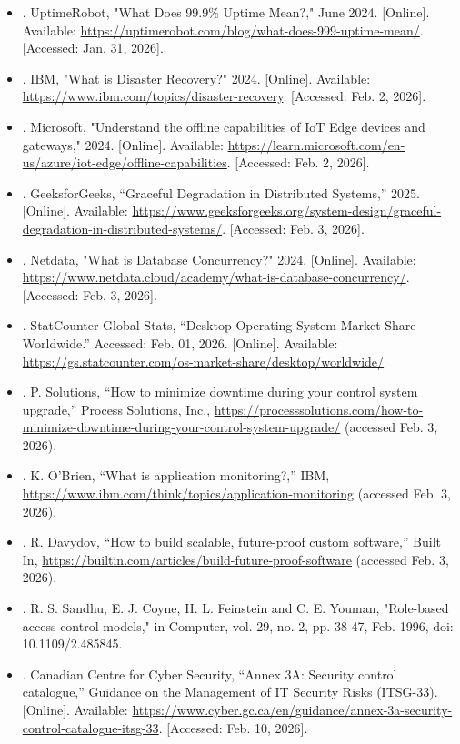 \documentclass[]{article}
\begin{document}
\begin{itemize}
	\item[] [11]. UptimeRobot, "What Does 99.9\% Uptime Mean?," June 2024. [Online]. Available: \url{https://uptimerobot.com/blog/what-does-999-uptime-mean/}. [Accessed: Jan. 31, 2026].
	\item[] [12]. IBM, "What is Disaster Recovery?" 2024. [Online]. Available: \url{https://www.ibm.com/topics/disaster-recovery}. [Accessed: Feb. 2, 2026].
	\item[] [13]. Microsoft, "Understand the offline capabilities of IoT Edge devices and gateways," 2024. [Online]. Available: \url{https://learn.microsoft.com/en-us/azure/iot-edge/offline-capabilities}. [Accessed: Feb. 2, 2026].
	\item[] [14]. GeeksforGeeks, “Graceful Degradation in Distributed Systems,” 2025. [Online]. Available: \url{https://www.geeksforgeeks.org/system-design/graceful-degradation-in-distributed-systems/}. [Accessed: Feb. 3, 2026].
	\item[] [15]. Netdata, "What is Database Concurrency?" 2024. [Online]. Available: \url{https://www.netdata.cloud/academy/what-is-database-concurrency/}. [Accessed: Feb. 3, 2026].
	\item[] [16]. StatCounter Global Stats, “Desktop Operating System Market Share Worldwide.” Accessed: Feb. 01, 2026. [Online]. Available: \url{https://gs.statcounter.com/os-market-share/desktop/worldwide/}
	\item[] [17]. P. Solutions, “How to minimize downtime during your control system upgrade,” Process Solutions, Inc., \url{https://processsolutions.com/how-to-minimize-downtime-during-your-control-system-upgrade/} (accessed Feb. 3, 2026).
	\item[] [18]. K. O’Brien, “What is application monitoring?,” IBM, \url{https://www.ibm.com/think/topics/application-monitoring} (accessed Feb. 3, 2026).
	\item[] [19]. R. Davydov, “How to build scalable, future-proof custom software,” Built In, \url{https://builtin.com/articles/build-future-proof-software} (accessed Feb. 3, 2026).
	\item[] [20]. R. S. Sandhu, E. J. Coyne, H. L. Feinstein and C. E. Youman, "Role-based access control models," in Computer, vol. 29, no. 2, pp. 38-47, Feb. 1996, doi: 10.1109/2.485845.
	\item[] [21]. Canadian Centre for Cyber Security, “Annex 3A: Security control catalogue,” Guidance on the Management of IT Security Risks (ITSG-33). [Online]. Available: \url{https://www.cyber.gc.ca/en/guidance/annex-3a-security-control-catalogue-itsg-33}. [Accessed: Feb. 10, 2026].

\end{itemize}
\end{document}
